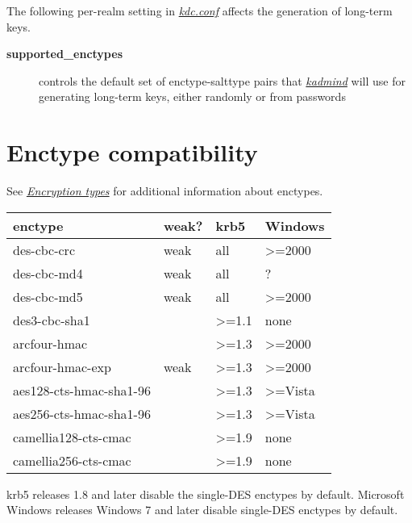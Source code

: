 \documentclass[letterpaper,10pt,english]{sphinxmanual}
\begin{document}
The following per-realm setting in {\hyperref[admin/conf_files/kdc_conf:kdc-conf-5]{\emph{kdc.conf}}} affects the
generation of long-term keys.
\begin{description}
\item[{\textbf{supported\_enctypes}}] \leavevmode
controls the default set of enctype-salttype pairs that {\hyperref[admin/admin_commands/kadmind:kadmind-8]{\emph{kadmind}}}
will use for generating long-term keys, either randomly or from
passwords

\end{description}


\section{Enctype compatibility}
\label{admin/enctypes:enctype-compatibility}
See {\hyperref[admin/conf_files/kdc_conf:encryption-types]{\emph{Encryption types}}} for additional information about enctypes.

\begin{tabulary}{\linewidth}{|L|L|L|L|}
\hline
\textsf{\relax 
enctype
} & \textsf{\relax 
weak?
} & \textsf{\relax 
krb5
} & \textsf{\relax 
Windows
}\\
\hline
des-cbc-crc
 & 
weak
 & 
all
 & 
\textgreater{}=2000
\\
\hline
des-cbc-md4
 & 
weak
 & 
all
 & 
?
\\
\hline
des-cbc-md5
 & 
weak
 & 
all
 & 
\textgreater{}=2000
\\
\hline
des3-cbc-sha1
 &  & 
\textgreater{}=1.1
 & 
none
\\
\hline
arcfour-hmac
 &  & 
\textgreater{}=1.3
 & 
\textgreater{}=2000
\\
\hline
arcfour-hmac-exp
 & 
weak
 & 
\textgreater{}=1.3
 & 
\textgreater{}=2000
\\
\hline
aes128-cts-hmac-sha1-96
 &  & 
\textgreater{}=1.3
 & 
\textgreater{}=Vista
\\
\hline
aes256-cts-hmac-sha1-96
 &  & 
\textgreater{}=1.3
 & 
\textgreater{}=Vista
\\
\hline
camellia128-cts-cmac
 &  & 
\textgreater{}=1.9
 & 
none
\\
\hline
camellia256-cts-cmac
 &  & 
\textgreater{}=1.9
 & 
none
\\
\hline\end{tabulary}


krb5 releases 1.8 and later disable the single-DES enctypes by
default.  Microsoft Windows releases Windows 7 and later disable
single-DES enctypes by default.
\end{document}
